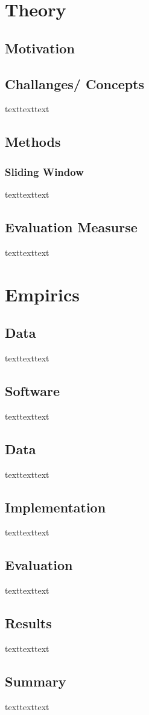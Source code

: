 \documentclass[12pt]{article}
\begin{document}


\renewcommand{\contentsname}{Table of Contents}
\tableofcontents

\newpage
\section{Theory}

\subsection{Motivation}

\subsection{Challanges/ Concepts}
texttexttext

\subsection{Methods}
\subsubsection{Sliding Window}
texttexttext

\subsection{Evaluation Measurse}
texttexttext

\section{Empirics}
\subsection{Data}
texttexttext

\subsection{Software}
texttexttext



\subsection{Data}
texttexttext

\subsection{Implementation}
texttexttext


\subsection{Evaluation}
texttexttext

\subsection{Results}
texttexttext

\subsection{Summary}
texttexttext




\newpage
\medskip

\end{document}
